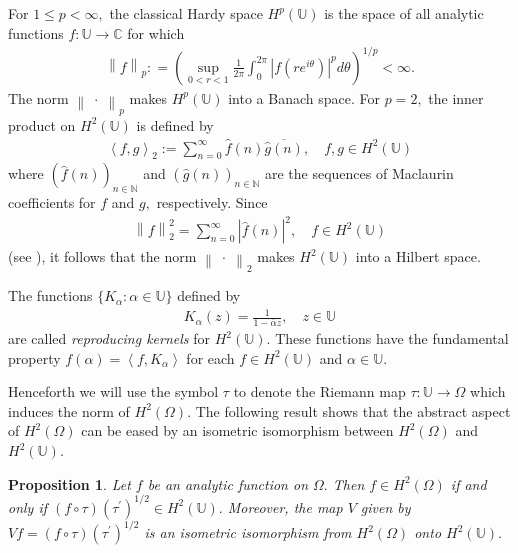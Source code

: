 \documentclass[11pt]{amsart}%
\newtheorem{pps}[thm]{Proposition}
\theoremstyle{definition}
\theoremstyle{remark}
\numberwithin{equation}{section}
\begin{document}
For $1\leq p <\infty,$ the classical Hardy space $H^{p}(\mathbb{U})$ is the
space of all analytic functions $f:\mathbb{U}\longrightarrow\mathbb{C}$ for
which
\begin{align*}
\left\|  f\right\|_p  : =\left(  \sup_{0< r<1}\frac{1}{2\pi}\int
_{0}^{2\pi}|f(re^{i\theta})|^{p}d\theta\right)  ^{1/p}<\infty.
\end{align*}
The norm $\left\| \; \cdot \; \right\|_p $ makes $H^p(\mathbb{U})$ into a Banach space. For $p=2,$ the inner product on $H^2(\mathbb{U})$ is defined by
\begin{align}
\label{096}\left\langle f,g\right\rangle_2 :=\sum_{n=0}^{\infty}\widehat
{f}(n)\overline{\widehat{g}(n)}, \quad f,g\in H^{2}(\mathbb{U})
\end{align}
where $(\widehat{f}(n))_{n\in\mathbb{N}}$ and $(\widehat{g}(n))_{n\in
\mathbb{N}}$ are the sequences of Maclaurin coefficients for $f$ and $g,$
respectively. Since 
\begin{align*}\left\| f\right\| _2^2=\sum_{n=0}^{\infty}|\widehat{f}(n)|^{2}, \quad f\in H^2(\mathbb{U})
\end{align*}
(see \cite[Theorem 1.1.12]{Avendano-Rosenthal}), it follows that the norm  $\left\| \; \cdot \; \right\|_2 $ makes $H^2(\mathbb{U})$ into a Hilbert space.

 The functions $\{K_{\alpha}:\alpha\in\mathbb{U}\}$ defined by
\begin{align*}
K_{\alpha}(z)=\frac{1}{1-\overline{\alpha}z}, \quad z\in\mathbb{U}%
\end{align*}
are called \textit{reproducing kernels} for $H^{2}(\mathbb{U}).$ These
functions have the fundamental property $f(\alpha)=\left\langle f,K_{\alpha
}\right\rangle $ for each $f\in H^{2}(\mathbb{U})$ and $\alpha\in\mathbb{U}.$

Henceforth we will use the symbol $\tau$ to denote the Riemann map
$\tau:\mathbb{U}\longrightarrow\Omega$ which induces the norm of $H^{2}%
(\Omega).$ The following result shows that the abstract aspect of
$H^{2}(\Omega)$ can be eased by an isometric isomorphism between $H^{2}%
(\Omega)$ and $H^{2}(\mathbb{U}).$

\begin{pps}
\label{03} Let $f$ be an analytic function on $\Omega.$ Then $f\in
H^{2}(\Omega)$ if and only if $(f\circ\tau)(\tau^{\prime})^{1/2}\in
H^{2}(\mathbb{U}).$ Moreover, the map $V$ given by $Vf=(f\circ\tau)
(\tau^{\prime})^{1/2}$ is an isometric isomorphism from $H^{2}(\Omega)$ onto
$H^{2}(\mathbb{U}).$
\end{pps}
\end{document}
